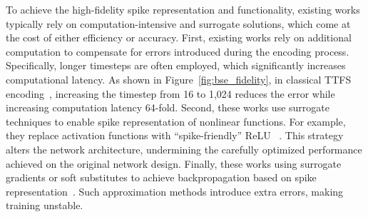 \documentclass{article}
\theoremstyle{plain}
\theoremstyle{definition}
\theoremstyle{remark}
\begin{document}
To achieve the high-fidelity spike representation and functionality, existing works typically rely on computation-intensive and surrogate solutions, which come at the cost of either efficiency or accuracy.
First, existing works rely on additional computation to compensate for errors introduced during the encoding process. Specifically,
longer timesteps are often employed, which significantly increases computational latency. As shown in Figure~\ref{fig:bse_fidelity}, in classical TTFS encoding~\citep{bonilla2022ttfs,stanojevic2024ttfs}, increasing the timestep from 16 to 1,024 reduces the error while increasing computation latency 64-fold.
Second, these works use surrogate techniques to enable spike representation of nonlinear functions.
For example, they replace activation functions with ``spike-friendly'' ReLU
~\citep{zhou2023spikformer, yao2023sdt, spikedattention2024}. This strategy alters the network architecture, undermining the carefully optimized performance achieved on the original network design.
Finally, these works using surrogate gradients or soft substitutes to achieve backpropagation based on spike representation~\citep{neftci2019surrogate, shrestha2018slayer, deng2022tet}. Such approximation methods introduce extra errors, making training unstable.
\end{document}
